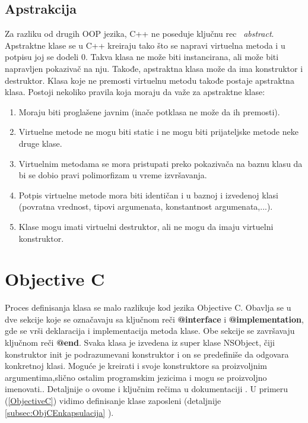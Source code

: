 \documentclass[a4paper]{article}
\begin{document}
\subsection{Apstrakcija}
\label{subsec:c++Apstrakcija}
Za razliku od drugih OOP jezika, C++ ne poseduje ključnu rec ~{\em abstract}. Apstraktne klase se u C++ kreiraju tako što se napravi virtuelna metoda i u potpisu joj se dodeli 0. Takva klasa ne može biti instancirana, ali može biti napravljen pokazivač na nju. Takođe, apstraktna klasa može da ima konstruktor i destruktor. Klasa koje ne premosti virtuelnu metodu takođe postaje apstraktna klasa. Postoji nekoliko pravila koja moraju da važe za apstraktne klase:
\begin{enumerate}
	\item Moraju biti proglašene javnim (inače potklasa ne može da ih premosti).
	\item Virtuelne metode ne mogu biti static i ne mogu biti prijateljske metode neke druge klase.
	\item Virtuelnim metodama se mora pristupati preko pokazivača na baznu klasu da bi se dobio pravi polimorfizam u vreme izvršavanja.
	\item Potpis virtuelne metode mora biti identičan i u baznoj i izvedenoj klasi (povratna vrednost, tipovi argumenata, konstantnost argumenata,...).
	\item Klase mogu imati virtuelni destruktor, ali ne mogu da imaju virtuelni konstruktor.
\end{enumerate}

\section{Objective C}
\label{sec:ObjectiveC}

Proces definisanja klasa se malo razlikuje kod jezika Objective C. Obavlja se u dve sekcije koje se označavaju sa ključnom reči \textbf{@interface} i \textbf{@implementation}, gde se vrši deklaracija i implementacija metoda klase. Obe sekcije se završavaju ključnom reči \textbf{@end}. Svaka klasa je izvedena iz super klase NSObject, čiji konstruktor init je podrazumevani konstruktor i on se predefiniše da odgovara konkretnoj klasi. Moguće je kreirati i svoje konstruktore sa proizvoljnim argumentima,slično ostalim programskim jezicima i mogu se proizvoljno imenovati.. Detaljnije o ovome i ključnim rečima u dokumentaciji \cite{ObjectiveCdoc}. U primeru (\ref{ObjectiveC}) vidimo definisanje klase zaposleni (detaljnije \ref{subsec:ObjCEnkapsulacija} ).
\end{document}
